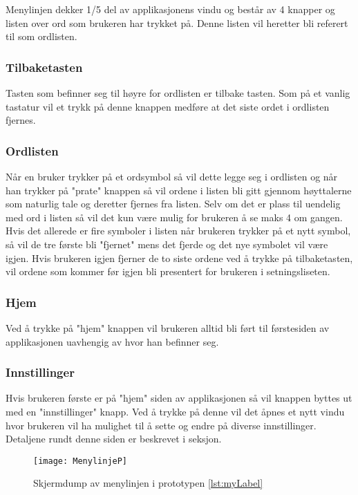 {Menylinjen dekker 1/5 del av applikasjonens vindu og består av 4 knapper og listen over ord som brukeren har trykket på. Denne listen vil heretter bli referert til som ordlisten. 
 
 
\subsubsection{Tilbaketasten} 
 
Tasten som befinner seg til høyre for ordlisten er tilbake tasten. Som på et vanlig tastatur vil et trykk på denne knappen medføre at det siste ordet i ordlisten fjernes. 
 
 
\subsubsection{Ordlisten} 
 
Når en bruker trykker på et ordsymbol så vil dette legge seg i ordlisten og når han trykker på "prate" knappen så vil ordene i listen bli gitt gjennom høyttalerne som naturlig tale og deretter fjernes fra listen. Selv om det er plass til uendelig med ord i listen så vil det kun være mulig for brukeren å se maks 4 om gangen. Hvis det allerede er fire symboler i listen når brukeren trykker på et nytt symbol, så vil de tre første bli "fjernet" mens det fjerde og det nye symbolet vil være igjen. Hvis brukeren igjen fjerner de to siste ordene ved å trykke på tilbaketasten,  vil ordene som kommer før igjen bli presentert for brukeren i setningsliseten.  
 
 
\subsubsection{Hjem} 
Ved å trykke på "hjem" knappen vil brukeren alltid bli ført til førstesiden av applikasjonen uavhengig av hvor han befinner seg.  
 
 
\subsubsection{Innstillinger} 
Hvis brukeren første er på "hjem" siden av applikasjonen så vil knappen byttes ut med en "innstillinger" knapp. Ved å trykke på denne vil det åpnes et nytt vindu hvor brukeren vil ha mulighet til å sette og endre på diverse innstillinger. Detaljene rundt denne siden er beskrevet i seksjon. 
 
 
\begin{figure}[ht!] 
\centering 
\texttt{[image: MenylinjeP]} 
\caption{Skjermdump av menylinjen i prototypen \ref{lst:myLabel}} 
\label{fig:menylinjen} 
\end{figure} 
 
}
